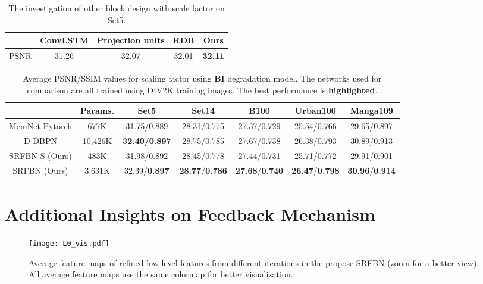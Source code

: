 \documentclass[10pt,twocolumn,letterpaper]{article}
\begin{document}
\begin{table*}[h]
	\begin{center}
		\begin{tabular}{|c|c|c|c|c|}
			\hline
    		 & ConvLSTM & Projection units  & RDB & Ours \\ \hline\hline
		PSNR &    31.26	      &    32.07   	       &   32.01	       &  \textbf{32.11}    \\ \hline
		\end{tabular}
		\medskip
		\caption{The investigation of other block design with scale factor  on Set5.}
		\label{block_design}			
	\end{center}
\end{table*}

\begin{table*}[h]
	\begin{center}
		\begin{tabular}{|c|c|c|c|c|c|c|}
			\hline
			& Params. & Set5        & Set14       & B100        & Urban100    & Manga109    \\ \hline\hline
			MemNet-Pytorch  &  677K &  31.75/0.889           &   28.31/0.775          &  27.37/0.729           &   25.54/0.766          &  29.65/0.897           \\ \hline
			D-DBPN \cite{Haris_2018_CVPR} &  10,426K   & \textbf{32.40/0.897} & 28.75/0.785 & 27.67/0.738 & 26.38/0.793 & 30.89/0.913 \\ \hline
			SRFBN-S (Ours) &  483K &  31.98/0.892           &   28.45/0.778          &  27.44/0.731          &   25.71/0.772          &  29.91/0.901         \\ \hline
			SRFBN (Ours) &  3,631K   &   32.39/\textbf{0.897}        &    \textbf{28.77}/\textbf{0.786}         &    \textbf{27.68}/\textbf{0.740}         &       \textbf{26.47}/\textbf{0.798 }    &  \textbf{30.96}/\textbf{0.914} \\ \hline         
		
		\end{tabular}
		\medskip
		\caption{Average PSNR/SSIM values for scaling factor  using \textbf{BI} degradation model. The networks used for comparison are all trained using DIV2K training images. The best performance is \textbf{highlighted}.}
		\label{div2k_comp}			
	\end{center}
\end{table*}

\section{Additional Insights on Feedback Mechanism}
\begin{figure}[t]
	\centering
	\texttt{[image: L0\_vis.pdf]}
	\caption{Average feature maps of refined low-level features from different iterations in the propose SRFBN (zoom for a better view). All average feature maps use the same colormap for better visualization.}\label{L0_vis}\end{figure}
\end{document}
